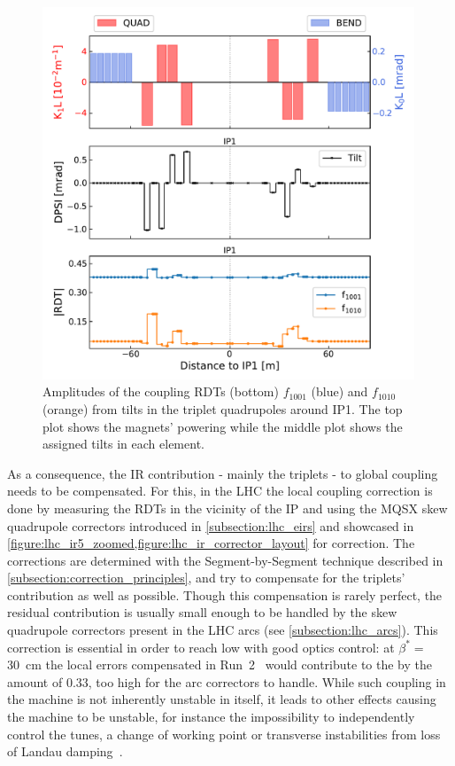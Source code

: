 \begin{figure}[!htb]
    \centering
    \includegraphics*[width=0.99\textwidth]{Figures/IR_Coupling_Correction/triplet_tilts_to_rdts.pdf}
    \caption{Amplitudes of the coupling RDTs (bottom) \(f_{1001}\) (\textcolor{mplblue}{blue}) and \(f_{1010}\) (\textcolor{mplorange}{orange}) from tilts in the triplet quadrupoles around IP\num{1}. The top plot shows the magnets' powering while the middle plot shows the assigned tilts in each element.}
    \label{figure:triplet_tilts_to_rdts}
\end{figure}

As a consequence, the IR contribution - mainly the triplets - to global coupling needs to be compensated.
For this, in the LHC the local coupling correction is done by measuring the RDTs in the vicinity of the IP and using the MQSX \gls{skew} quadrupole correctors introduced in \cref{subsection:lhc_eirs} and showcased in \cref{figure:lhc_ir5_zoomed,figure:lhc_ir_corrector_layout} for correction.
The corrections are determined with the Segment-by-Segment technique described in \cref{subsection:correction_principles}, and try to compensate for the triplets' contribution as well as possible.
Though this compensation is rarely perfect, the residual contribution is usually small enough to be handled by the skew quadrupole correctors present in the LHC arcs (see \cref{subsection:lhc_arcs}).
This correction is essential in order to reach low  with good optics control: at \(\beta^{*}=\) \qty{30}{\centi\meter} the local errors compensated in Run~\num{2}~\cite{CERN:Persson:LHCOpticsCorrectionsEvian2019} would contribute to the  by the amount of \num{0.33}, too high for the arc correctors to handle.
While such coupling in the machine is not inherently unstable in itself, it leads to other effects causing the machine to be unstable, for instance the impossibility to independently control the tunes, a change of working point or transverse instabilities from loss of Landau damping~\cite{MASTERS:Soubelet:Optics_Octupole_PyHEADTAIL,PRAB:Carver:Transverse_Instabilities_With_Coupling}.

